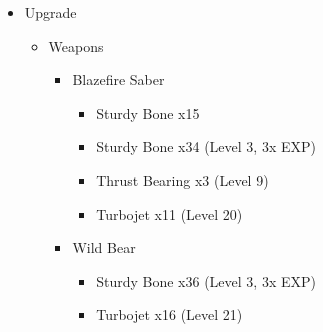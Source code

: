 	\begin{upgrade}
		\begin{itemize}
			\item Upgrade
			      \begin{itemize}
				      \item Weapons
				            \begin{itemize}
					            \item Blazefire Saber
					                  \begin{itemize}
						                  \item Sturdy Bone x15
						                  \item Sturdy Bone x34 (Level 3, 3x EXP)
						                  \item Thrust Bearing x3 (Level 9)
						                  \item Turbojet x11 (Level 20)
					                  \end{itemize}
					            \item Wild Bear
					                  \begin{itemize}
						                  \item Sturdy Bone x36 (Level 3, 3x EXP)
						                  \item Turbojet x16 (Level 21)
					                  \end{itemize}
				            \end{itemize}
			      \end{itemize}
		\end{itemize}
	\end{upgrade}
	

